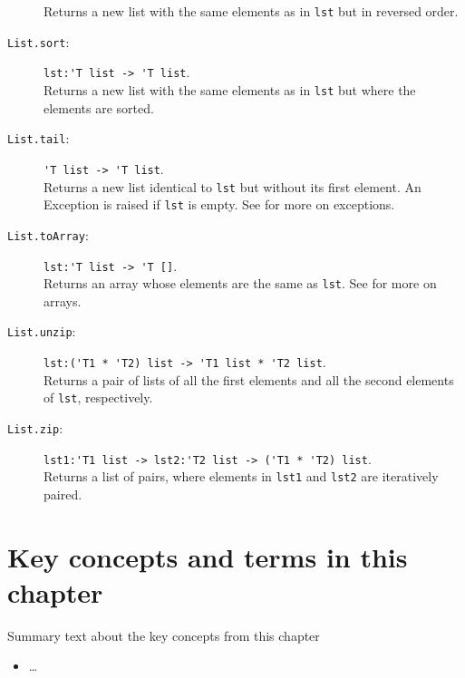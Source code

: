 \documentclass[springer.tex]{subfiles}
\begin{document}
\begin{description}
  Returns a new list with the same elements as in \lstinline{lst} but in reversed order.
\item[\texttt{List.sort}:] \lstinline{lst:'T list -> 'T list}.~\\
  Returns a new list with the same elements as in \lstinline{lst} but where the elements are sorted.
\item[\texttt{List.tail}:]  \lstinline{'T list -> 'T list}.~\\
  Returns a new list identical to \lstinline{lst} but without its first element. An Exception is raised if \lstinline{lst} is empty.  See  for more on exceptions.
\item[\texttt{List.toArray}:] \lstinline{lst:'T list -> 'T []}.~\\
  Returns an array whose elements are the same as \lstinline{lst}.  See  for more on arrays.
\item[\texttt{List.unzip}:] \lstinline{lst:('T1 * 'T2) list -> 'T1 list * 'T2 list}.~\\
  Returns a pair of lists of all the first elements and all the second elements of \lstinline{lst}, respectively.
\item[\texttt{List.zip}:] \lstinline{lst1:'T1 list -> lst2:'T2 list -> ('T1 * 'T2) list}.~\\
  Returns a list of pairs, where elements in \lstinline{lst1} and \lstinline{lst2} are iteratively paired.
\end{description}

\section{Key concepts and terms in this chapter}
Summary text about the key concepts from this chapter
\begin{itemize}
\item \ldots
\end{itemize}
\end{document}
